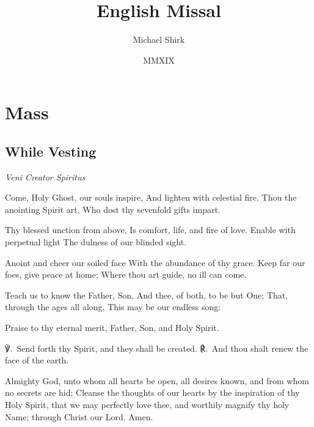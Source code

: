 \documentclass[letterpaper,17pt,twoside,extrafontsizes,final]{memoir}
\begin{document}
\frontmatter
\title{English Missal}
\author{Michael Shirk}
\date{MMXIX}
\maketitle

\mainmatter
\chapter*{Mass}
\section*{While Vesting}

{\itshape Veni Creator Spiritus}
{\obeylines
Come, Holy Ghost, our souls inspire, 
And lighten with celestial fire. 
Thou the anointing Spirit art, 
Who dost thy sevenfold gifts impart.

Thy blessed unction from above, 
Is comfort, life, and fire of love.
Enable with perpetual light 
The dulness of our blinded sight.

Anoint and cheer our soiled face 
With the abundance of thy grace. 
Keep far our foes, give peace at home; 
Where thou art guide, no ill can come.

Teach us to know the Father, Son, 
And thee, of both, to be but One; 
That, through the ages all along, 
This may be our endless song:

    Praise to thy eternal merit, 
    Father, Son, and Holy Spirit.
}
℣.\ Send forth thy Spirit, and they shall be created.
℟.\ And thou shalt renew the face of the earth. 

Almighty God, unto whom all hearts be open, all desires known, and from whom no secrets are hid; Cleanse the thoughts of our hearts by the inspiration of thy Holy Spirit, that we may perfectly love thee, and worthily magnify thy holy Name; through Christ our Lord. Amen.
\end{document}
